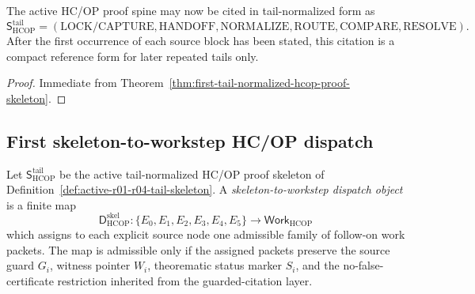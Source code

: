 \begin{corollary}
\label{cor:v3340-r14-working-rule}
The active HC/OP proof spine may now be cited in tail-normalized form as
\[
  \mathsf S_{\mathrm{HCOP}}^{\mathrm{tail}}
  =
  (\mathrm{LOCK/CAPTURE},\mathrm{HANDOFF},\mathrm{NORMALIZE},
   \mathrm{ROUTE},\mathrm{COMPARE},\mathrm{RESOLVE}).
\]
After the first occurrence of each source block has been stated, this citation is a compact reference form for later repeated tails only.
\end{corollary}

\begin{proof}
Immediate from Theorem~\ref{thm:first-tail-normalized-hcop-proof-skeleton}.
\end{proof}


\subsection{First skeleton-to-workstep HC/OP dispatch}
\label{subsec:first-skeleton-to-workstep-hcop-dispatch}

\begin{definition}
\label{def:skeleton-to-workstep-dispatch-object}
Let \(\mathsf S_{\mathrm{HCOP}}^{\mathrm{tail}}\) be the active tail-normalized HC/OP proof skeleton of Definition~\ref{def:active-r01-r04-tail-skeleton}. A \emph{skeleton-to-workstep dispatch object} is a finite map
\[
  \mathsf D_{\mathrm{HCOP}}^{\mathrm{skel}}
  :
  \{E_0,E_1,E_2,E_3,E_4,E_5\}
  \longrightarrow
  \mathsf{Work}_{\mathrm{HCOP}}
\]
which assigns to each explicit source node one admissible family of follow-on work packets. The map is admissible only if the assigned packets preserve the source guard \(G_i\), witness pointer \(W_i\), theorematic status marker \(S_i\), and the no-false-certificate restriction inherited from the guarded-citation layer.
\end{definition}


